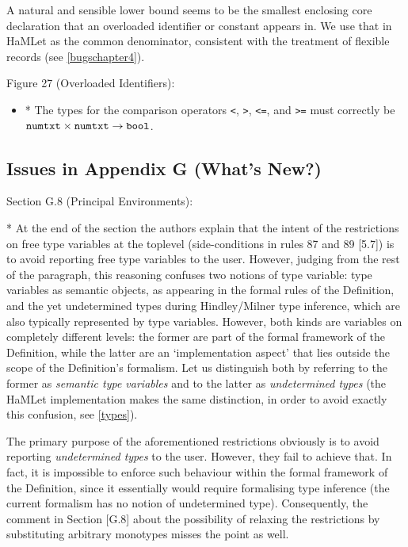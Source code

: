 \documentclass[twoside,titlepage]{article}
\begin{document}
\begin{appendix}
\begin{itemize}
A natural and sensible lower bound seems to be the smallest enclosing core declaration that an overloaded identifier or constant appears in. We use that in HaMLet as the common denominator, consistent with the treatment of flexible records (see \ref{bugschapter4}).


\end{itemize}

Figure 27 (Overloaded Identifiers):

\begin{itemize}
\item * The types for the comparison operators {\tt<}, {\tt>}, {\tt<=}, and {\tt>=} must correctly be ${\tt numtxt} \times {\tt numtxt} \to {\tt bool}$.
\end{itemize}



\subsection{Issues in Appendix G (What's New?)}
\label{bugsappendixg}

Section G.8 (Principal Environments):

* At the end of the section the authors explain that the intent of the restrictions on free type variables at the toplevel (side-conditions in rules 87 and 89 [5.7]) is to avoid reporting free type variables to the user. However, judging from the rest of the paragraph, this reasoning confuses two notions of type variable: type variables as semantic objects, as appearing in the formal rules of the Definition, and the yet undetermined types during Hindley/Milner type inference, which are also typically represented by type variables. However, both kinds are variables on completely different levels: the former are part of the formal framework of the Definition, while the latter are an `implementation aspect' that lies outside the scope of the Definition's formalism. Let us distinguish both by referring to the former as {\em semantic type variables} and to the latter as {\em undetermined types} (the HaMLet implementation makes the same distinction, in order to avoid exactly this confusion, see \ref{types}).

The primary purpose of the aforementioned restrictions obviously is to avoid reporting {\em undetermined types} to the user. However, they fail to achieve that. In fact, it is impossible to enforce such behaviour within the formal framework of the Definition, since it essentially would require formalising type inference (the current formalism has no notion of undetermined type). Consequently, the comment in Section [G.8] about the possibility of relaxing the restrictions by substituting arbitrary monotypes misses the point as well.


\end{appendix}
\end{document}
